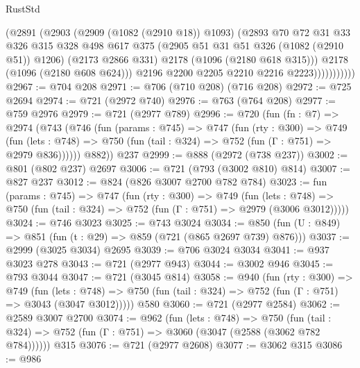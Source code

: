 \begin{lexlean}{RustStd}
\begin{coremodule}
                        (@2891
                          (@2903
                            (@2909 (@1082 (@2910 @18)) @1093)
                            (@2893
                              @70
                              @72
                              @31
                              @33
                              @326
                              @315
                              @328
                              @498
                              @617
                              @375
                              (@2905 @51 @31 @51 @326 (@1082 (@2910 @51)) @1206)
                              (@2173 @2866 @331)
                              @2178
                              (@1096 (@2180 @618 @315)))
                            @2178
                            (@1096 (@2180 @608 @624)))
                          @2196
                          @2200
                          @2205
                          @2210
                          @2216
                          @2223)))))))))))
@2967 := @704 @208
@2971 := @706 (@710 @208) (@716 @208)
@2972 := @725 @2694
@2974 := @721 (@2972 @740)
@2976 := @763 (@764 @208)
@2977 := @759 @2976
@2979 := @721 (@2977 @789)
@2996 := @720
    (fun (fn : @7) =>
    @2974
      (@743
        (@746
          (fun (params : @745) =>
          @747
            (fun (rty : @300) =>
            @749
              (fun (lets : @748) =>
              @750 (fun (tail : @324) => @752 (fun (Γ : @751) => @2979 @836))))))
        @882))
    @237
@2999 := @888 (@2972 (@738 @237))
@3002 := @801 (@802 @237) @2697
@3006 := @721 (@793 (@3002 @810) @814)
@3007 := @827 @237
@3012 := @824 (@826 @3007 @2700 @782 @784)
@3023 := fun (params : @745) =>
  @747
    (fun (rty : @300) =>
    @749
      (fun (lets : @748) =>
      @750 (fun (tail : @324) => @752 (fun (Γ : @751) => @2979 (@3006 @3012)))))
@3024 := @746 @3023
@3025 := @743 @3024
@3034 := @850 (fun (U : @849) => @851 (fun (t : @29) => @859 (@721 (@865 @2697 @739) @876)))
@3037 := @2999 (@3025 @3034) @2695
@3039 := @706 @3024 @3034
@3041 := @937 @3023 @278
@3043 := @721 (@2977 @943)
@3044 := @3002 @946
@3045 := @793 @3044
@3047 := @721 (@3045 @814)
@3058 := @940
    (fun (rty : @300) =>
    @749
      (fun (lets : @748) =>
      @750 (fun (tail : @324) => @752 (fun (Γ : @751) => @3043 (@3047 @3012)))))
    @580
@3060 := @721 (@2977 @2584)
@3062 := @2589 @3007 @2700
@3074 := @962
    (fun (lets : @748) =>
    @750 (fun (tail : @324) => @752 (fun (Γ : @751) => @3060 (@3047 (@2588 (@3062 @782 @784))))))
    @315
@3076 := @721 (@2977 @2608)
@3077 := @3062 @315
@3086 := @986

\end{coremodule}
\end{lexlean}
